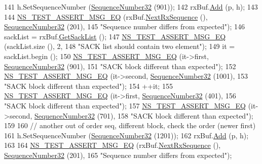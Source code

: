 \begin{DoxyCode}
141   h.SetSequenceNumber (\hyperlink{classns3_1_1SequenceNumber}{SequenceNumber32} (901));
142   rxBuf.\hyperlink{classns3_1_1TcpRxBuffer_a35a036383b8976cb79738c28aa01d5d0}{Add} (p, h);
143 
144   \hyperlink{group__testing_ga2a9d78cffb3db8e867c35fff0b698cf5}{NS\_TEST\_ASSERT\_MSG\_EQ} (rxBuf.\hyperlink{classns3_1_1TcpRxBuffer_ae994bf90329d10f17b59d32907b04ca9}{NextRxSequence} (), 
      \hyperlink{group__network_gacb2070e4e98d2d5135c9bede58f07a03}{SequenceNumber32} (201),
145                          \textcolor{stringliteral}{"Sequence number differs from expected"});
146   sackList = rxBuf.\hyperlink{classns3_1_1TcpRxBuffer_afc5d672da4595330754de1bb3933a9c7}{GetSackList} ();
147   \hyperlink{group__testing_ga2a9d78cffb3db8e867c35fff0b698cf5}{NS\_TEST\_ASSERT\_MSG\_EQ} (sackList.size (), 2,
148                          \textcolor{stringliteral}{"SACK list should contain two element"});
149   it = sackList.begin ();
150   \hyperlink{group__testing_ga2a9d78cffb3db8e867c35fff0b698cf5}{NS\_TEST\_ASSERT\_MSG\_EQ} (it->first, \hyperlink{classns3_1_1SequenceNumber}{SequenceNumber32} (901),
151                          \textcolor{stringliteral}{"SACK block different than expected"});
152   \hyperlink{group__testing_ga2a9d78cffb3db8e867c35fff0b698cf5}{NS\_TEST\_ASSERT\_MSG\_EQ} (it->second, \hyperlink{classns3_1_1SequenceNumber}{SequenceNumber32} (1001),
153                          \textcolor{stringliteral}{"SACK block different than expected"});
154   ++it;
155   \hyperlink{group__testing_ga2a9d78cffb3db8e867c35fff0b698cf5}{NS\_TEST\_ASSERT\_MSG\_EQ} (it->first, \hyperlink{classns3_1_1SequenceNumber}{SequenceNumber32} (401),
156                          \textcolor{stringliteral}{"SACK block different than expected"});
157   \hyperlink{group__testing_ga2a9d78cffb3db8e867c35fff0b698cf5}{NS\_TEST\_ASSERT\_MSG\_EQ} (it->second, \hyperlink{classns3_1_1SequenceNumber}{SequenceNumber32} (701),
158                          \textcolor{stringliteral}{"SACK block different than expected"});
159 
160   \textcolor{comment}{// another out of order seq, different block, check the order (newer first)}
161   h.SetSequenceNumber (\hyperlink{classns3_1_1SequenceNumber}{SequenceNumber32} (1201));
162   rxBuf.\hyperlink{classns3_1_1TcpRxBuffer_a35a036383b8976cb79738c28aa01d5d0}{Add} (p, h);
163 
164   \hyperlink{group__testing_ga2a9d78cffb3db8e867c35fff0b698cf5}{NS\_TEST\_ASSERT\_MSG\_EQ} (rxBuf.\hyperlink{classns3_1_1TcpRxBuffer_ae994bf90329d10f17b59d32907b04ca9}{NextRxSequence} (), 
      \hyperlink{group__network_gacb2070e4e98d2d5135c9bede58f07a03}{SequenceNumber32} (201),
165                          \textcolor{stringliteral}{"Sequence number differs from expected"});

\end{DoxyCode}
